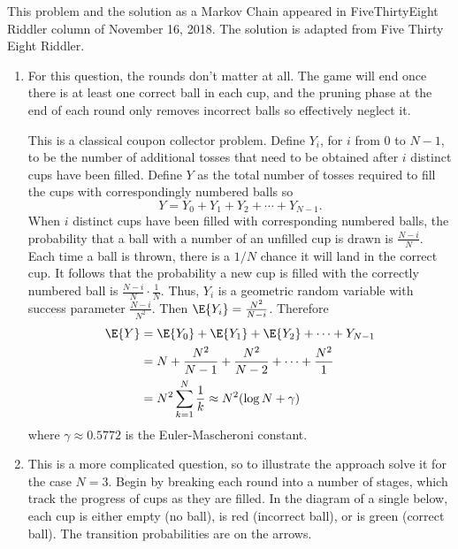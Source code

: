\documentclass[12pt]{article}
\begin{document}
\begin{solution}
    \begin{remark}
        This problem and the solution as a Markov Chain appeared in
        {FiveThirtyEight} Riddler column of November 16, 2018.  The
        solution is adapted from 
        {Five Thirty Eight Riddler}.
    \end{remark}

    \begin{enumerate}[label=(\alph*)]
    \item
        For this question, the rounds don’t matter at all.  The game
        will end once there is at least one correct ball in each cup,
        and the pruning phase at the end of each round only removes
        incorrect balls so effectively neglect it.

        This is a classical coupon collector problem.  Define \( Y_i \),
        for \( i \) from \( 0 \) to \( N - 1 \), to be the number of additional
        tosses that need to be obtained after \( i \) distinct cups have
        been filled.  Define \( Y \) as the total number of tosses
        required to fill the cups with correspondingly numbered balls so
        \[
            Y = Y_0 + Y_1 + Y_2 + \cdots + Y_{N-1}.
        \] When \( i \) distinct cups have been filled with
        corresponding numbered balls, the probability that a ball with a
        number of an unfilled cup is drawn is \( \frac{N-i}{N} \).  Each
        time a ball is thrown, there is a \( 1/N \) chance it will land
        in the correct cup.  It follows that the probability a new cup
        is filled with the correctly numbered ball is \( \frac{N-i}{N}
        \cdot \frac{1}{N} \).  Thus, \( Y_i \) is a geometric random
        variable with success parameter \( \frac{N-i}{N^2} \). Then \(
        \E{Y_i} = \frac{N^2}{N-i} \).  Therefore
        \begin{align*}
            \E{Y} &= \E{Y_0} + \E{Y_1} + \E{Y_2} + \cdots + Y_{N-1} \\
            &= N + \frac{N^2}{N-1} + \frac{N^2}{N-2} + \cdots + \frac{N^2}
            {1} \\
            &= N^2 \sum_{k=1}^N \frac{1}{k} \approx N^2(\log N + \gamma)
        \end{align*}
        where \( \gamma \approx 0.5772 \) is the Euler-Mascheroni
        constant.
    \item
        This is a more complicated question, so to illustrate the
        approach solve it for the case \( N=3 \).  Begin by breaking
        each round into a number of stages, which track the progress of
        cups as they are filled.  In the diagram of a single below, each
        cup is either empty (no ball), is red (incorrect ball), or is
        green (correct ball).  The transition probabilities are on the
        arrows.


\end{enumerate}
\end{solution}
\end{document}
